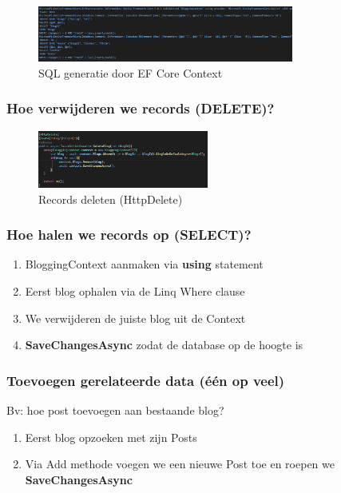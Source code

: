 \documentclass{article}
\begin{document}
\begin{figure}[H]
    \centering
    \includegraphics[width=0.75\textwidth]{efcore-insert2.png}
    \caption{SQL generatie door EF Core Context}
\end{figure}


\subsubsection{Hoe verwijderen we records (DELETE)?}

\begin{figure}[H]
    \centering
    \includegraphics[width=0.5\textwidth]{efcore-delete.png}
    \caption{Records deleten (HttpDelete)}
\end{figure}


\subsubsection{Hoe halen we records op (SELECT)?}

\begin{enumerate}
    \item BloggingContext aanmaken via \textbf{using} statement
    \item Eerst blog ophalen via de Linq Where clause
    \item We verwijderen de juiste blog uit de Context
    \item \textbf{SaveChangesAsync} zodat de database op de hoogte is
\end{enumerate}

\subsubsection{Toevoegen gerelateerde data (één op veel)}

Bv: hoe post toevoegen aan bestaande blog?

\begin{enumerate}
    \item Eerst blog opzoeken met zijn Posts
    \item Via Add methode voegen we een nieuwe Post toe en roepen we \textbf{SaveChangesAsync}
\end{enumerate}
\end{document}
